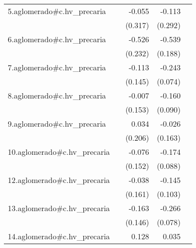 {\begin{longtable}{l*{4}{D{.}{.}{-1}}}
\addlinespace
5.aglomerado#c.hv\_precaria&                     &      -0.055         &      -0.113         &                     \\
            &                     &     (0.317)         &     (0.292)         &                     \\
\addlinespace
6.aglomerado#c.hv\_precaria&                     &      -0.526\sym{*}  &      -0.539\sym{**} &                     \\
            &                     &     (0.232)         &     (0.188)         &                     \\
\addlinespace
7.aglomerado#c.hv\_precaria&                     &      -0.113         &      -0.243\sym{**} &                     \\
            &                     &     (0.145)         &     (0.074)         &                     \\
\addlinespace
8.aglomerado#c.hv\_precaria&                     &      -0.007         &      -0.160         &                     \\
            &                     &     (0.153)         &     (0.090)         &                     \\
\addlinespace
9.aglomerado#c.hv\_precaria&                     &       0.034         &      -0.026         &                     \\
            &                     &     (0.206)         &     (0.163)         &                     \\
\addlinespace
10.aglomerado#c.hv\_precaria&                     &      -0.076         &      -0.174\sym{*}  &                     \\
            &                     &     (0.152)         &     (0.088)         &                     \\
\addlinespace
12.aglomerado#c.hv\_precaria&                     &      -0.038         &      -0.145         &                     \\
            &                     &     (0.161)         &     (0.103)         &                     \\
\addlinespace
13.aglomerado#c.hv\_precaria&                     &      -0.163         &      -0.266\sym{***}&                     \\
            &                     &     (0.146)         &     (0.078)         &                     \\
\addlinespace
14.aglomerado#c.hv\_precaria&                     &       0.128         &       0.035         &                     \\

\end{longtable}}

